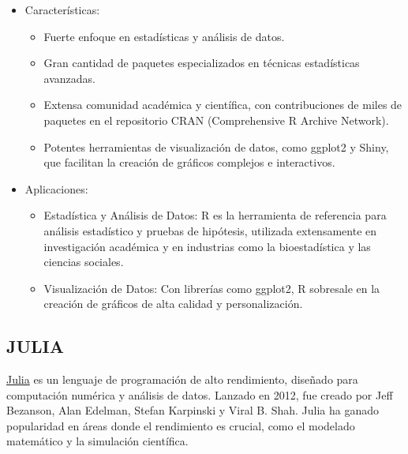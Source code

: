 \documentclass[
  us-letterpaper,
]{scrreprt}
\theoremstyle{plain}
\theoremstyle{plain}
\theoremstyle{definition}
\theoremstyle{remark}
\begin{document}
\begin{itemize}
\item
  Características:

  \begin{itemize}
  \item
    Fuerte enfoque en estadísticas y análisis de datos.
  \item
    Gran cantidad de paquetes especializados en técnicas estadísticas
    avanzadas.
  \item
    Extensa comunidad académica y científica, con contribuciones de
    miles de paquetes en el repositorio CRAN (Comprehensive R Archive
    Network).
  \item
    Potentes herramientas de visualización de datos, como ggplot2 y
    Shiny, que facilitan la creación de gráficos complejos e
    interactivos.
  \end{itemize}
\item
  Aplicaciones:

  \begin{itemize}
  \item
    Estadística y Análisis de Datos: R es la herramienta de referencia
    para análisis estadístico y pruebas de hipótesis, utilizada
    extensamente en investigación académica y en industrias como la
    bioestadística y las ciencias sociales.
  \item
    Visualización de Datos: Con librerías como ggplot2, R sobresale en
    la creación de gráficos de alta calidad y personalización.
  \end{itemize}
\end{itemize}

\subsection{JULIA}\label{julia}

\href{https://julialang.org/}{Julia} es un lenguaje de programación de
alto rendimiento, diseñado para computación numérica y análisis de
datos. Lanzado en 2012, fue creado por Jeff Bezanson, Alan Edelman,
Stefan Karpinski y Viral B. Shah. Julia ha ganado popularidad en áreas
donde el rendimiento es crucial, como el modelado matemático y la
simulación científica.
\end{document}
